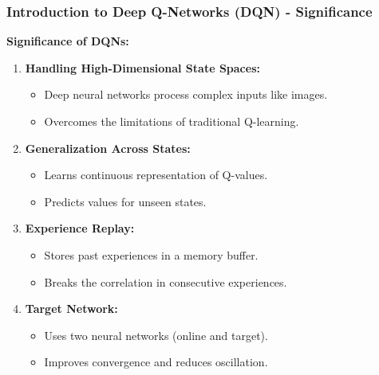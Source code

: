 \documentclass[aspectratio=169]{beamer}
\begin{document}
\begin{frame}[fragile]
    \frametitle{Introduction to Deep Q-Networks (DQN) - Significance}
    \textbf{Significance of DQNs:}
    \begin{enumerate}
        \item \textbf{Handling High-Dimensional State Spaces:} 
        \begin{itemize}
            \item Deep neural networks process complex inputs like images.
            \item Overcomes the limitations of traditional Q-learning.
        \end{itemize}
        
        \item \textbf{Generalization Across States:} 
        \begin{itemize}
            \item Learns continuous representation of Q-values.
            \item Predicts values for unseen states.
        \end{itemize}
        
        \item \textbf{Experience Replay:} 
        \begin{itemize}
            \item Stores past experiences in a memory buffer.
            \item Breaks the correlation in consecutive experiences.
        \end{itemize}
        
        \item \textbf{Target Network:} 
        \begin{itemize}
            \item Uses two neural networks (online and target).
            \item Improves convergence and reduces oscillation.
        \end{itemize}
    \end{enumerate}
\end{frame}
\end{document}
